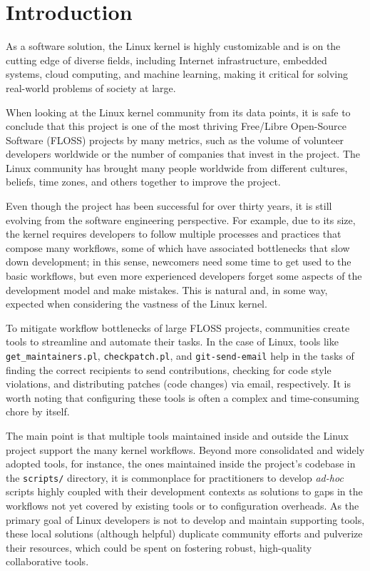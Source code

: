 \section{Introduction}

As a software solution, the Linux kernel is highly customizable and is on the
cutting edge of diverse fields, including Internet infrastructure, embedded
systems, cloud computing, and machine learning, making it critical for solving
real-world problems of society at large. 

When looking at the Linux kernel community from its data points, it is safe to
conclude that this project is one of the most thriving Free/Libre Open-Source
Software (FLOSS) projects by many metrics, such as the volume of volunteer
developers worldwide or the number of companies that invest in the project. The
Linux community has brought many people worldwide from different cultures,
beliefs, time zones, and others together to improve the project.

Even though the project has been successful for over thirty years, it is still
evolving from the software engineering perspective. For example, due to its
size, the kernel requires developers to follow multiple processes and practices
that compose many workflows, some of which have associated bottlenecks that slow
down development; in this sense, newcomers need some time to get used to the
basic workflows, but even more experienced developers forget some aspects of the
development model and make mistakes. This is natural and, in some way, expected
when considering the vastness of the Linux kernel.

To mitigate workflow bottlenecks of large FLOSS projects, communities create
tools to streamline and automate their tasks. In the case of Linux, tools like
\texttt{get\_maintainers.pl}, \texttt{checkpatch.pl}, and
\texttt{git-send-email} help in the tasks of finding the correct recipients to
send contributions, checking for code style violations, and distributing patches
(code changes) via email, respectively. It is worth noting that configuring
these tools is often a complex and time-consuming chore by itself.

The main point is that multiple tools maintained inside and outside the Linux
project support the many kernel workflows. Beyond more consolidated and widely
adopted tools, for instance, the ones maintained inside the project's codebase
in the \texttt{scripts/} directory, it is commonplace for practitioners to
develop \textit{ad-hoc} scripts highly coupled with their development contexts
as solutions to gaps in the workflows not yet covered by existing tools or to
configuration overheads. As the primary goal of Linux developers is not to
develop and maintain supporting tools, these local solutions (although helpful)
duplicate community efforts and pulverize their resources, which could be spent
on fostering robust, high-quality collaborative tools.

